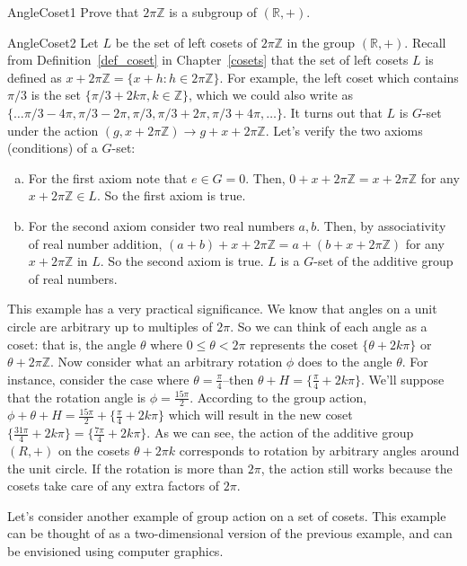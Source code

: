 \begin{exercise}{AngleCoset1}
Prove that $2 \pi \mathbb{Z}$ is a subgroup of $(\mathbb{R},+)$.
\end{exercise}
\begin {example}{AngleCoset2}
Let $L$ be the set of left cosets of $2\pi \mathbb{Z}$ in the group $(\mathbb{R},+)$.  Recall from Definition~\ref{def_coset} in Chapter~\ref{cosets} that the set of left cosets $L$ is defined as $x+2\pi \mathbb{Z}=\{x+h:h\in 2\pi\mathbb{Z}\}$.  For example, the left coset which contains $\pi/3$ is the set $ \{\pi/3 +2k\pi, k\in \mathbb{Z}\}$, which we could also write as $\{ \ldots \pi/3-4\pi, \pi/3-2\pi, \pi/3, \pi/3+2\pi, \pi/3 + 4\pi, \ldots \}$.  It turns out that $L$ is $G$-set under the action  
$(g,x+2\pi\mathbb{Z}) \rightarrow g+x+2\pi\mathbb{Z}$. Let's verify the two axioms (conditions) of a $G$-set:
\begin{enumerate}[(a)]
\item
 For the first axiom note that $e\in G=0$. Then, $0+x+2\pi\mathbb{Z}=x+2\pi\mathbb{Z}$ for any $x+2\pi\mathbb{Z}\in L$.  So the first axiom is true.
\item 
For the second axiom consider two real numbers $a,b$.  Then, by associativity of real number addition, $(a+b)+x+2\pi\mathbb{Z}=a+(b+x+2\pi\mathbb{Z})$ for any $x+2\pi\mathbb{Z}$  in $L$.  So the second axiom is true.  $L$ is a $G$-set of the additive group of real numbers.
\end {enumerate}
This example has a very practical significance. We know that angles on a unit circle are arbitrary up to multiples of $2\pi$. So we can think of each angle as a coset:  that is, the angle $\theta$ where $0\leq\theta<2\pi$ represents the coset $\{\theta +2k\pi\}$ or $\theta + 2\pi \mathbb{Z}$. Now consider what an arbitrary rotation $\phi$ does to the angle $\theta$. For instance, consider the case where $\theta=\frac{\pi}{4}$--then $\theta+H=\{ \frac{\pi}{4}+2k\pi\}$.  We'll suppose that the rotation angle is $\phi=\frac{15\pi}{2}$.  According to the group action, $\phi+\theta+H =\frac{15\pi}{2}+\{\frac{\pi}{4}+2k\pi\}$ which will result in the new coset $\{\frac{31\pi}{4}+2k\pi\}=\{\frac{7\pi}{4}+2k\pi\}$.
As we can see, the action of the additive group $(R,+)$ on the cosets ${\theta + 2\pi k}$ corresponds to rotation by arbitrary angles around the unit circle. If the rotation is more than $2 \pi$, the action still works because the cosets take care of any extra factors of $2 \pi$.
\end {example}
Let's consider another example of group action on a set of cosets.  This example can be thought of as a two-dimensional version of the previous example, and can be envisioned using computer graphics.

